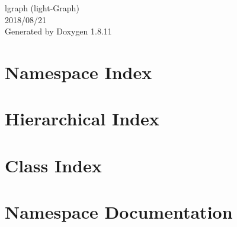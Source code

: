 \documentclass[twoside]{book}
\newcommand{\+}{\discretionary{\mbox{\scriptsize$\hookleftarrow$}}{}{}}
\newcommand{\clearemptydoublepage}{%
  \newpage{\pagestyle{empty}\cleardoublepage}%
}
\begin{document}
\hypersetup{pageanchor=false,
             bookmarksnumbered=true,
             pdfencoding=unicode
            }
\begin{titlepage}
\vspace*{7cm}
\begin{center}%
{\Large lgraph (light-\/\+Graph) \\[1ex]\large 2018/08/21 }\\
\vspace*{1cm}
{\large Generated by Doxygen 1.8.11}\\
\end{center}
\end{titlepage}
\clearemptydoublepage
\tableofcontents
\clearemptydoublepage
{}
\hypersetup{pageanchor=true}

\chapter{Namespace Index}

\chapter{Hierarchical Index}

\chapter{Class Index}

\chapter{Namespace Documentation}















\end{document}
